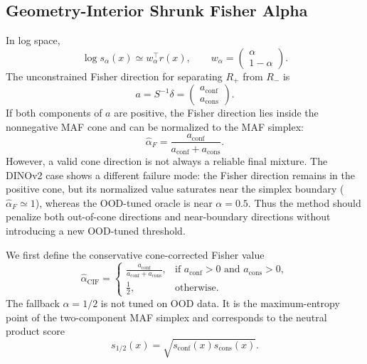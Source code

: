 \subsection{Geometry-Interior Shrunk Fisher Alpha}

In log space,
\begin{equation}
    \log s_{\alpha}(x)
    \simeq
    w_{\alpha}^{\top} r(x),
    \qquad
    w_{\alpha}
    =
    \begin{pmatrix}
        \alpha\\
        1-\alpha
    \end{pmatrix}.
\end{equation}
The unconstrained Fisher direction for separating $R_{+}$ from $R_{-}$ is
\begin{equation}
    a = S^{-1}\delta
    =
    \begin{pmatrix}
        a_{\mathrm{conf}}\\
        a_{\mathrm{cons}}
    \end{pmatrix}.
\end{equation}
If both components of $a$ are positive, the Fisher direction lies inside the
nonnegative MAF cone and can be normalized to the MAF simplex:
\begin{equation}
    \hat{\alpha}_{F}
    =
    \frac{a_{\mathrm{conf}}}
         {a_{\mathrm{conf}}+a_{\mathrm{cons}}}.
\end{equation}
However, a valid cone direction is not always a reliable final mixture.  The
DINOv2 case shows a different failure mode: the Fisher direction remains in the
positive cone, but its normalized value saturates near the simplex boundary
($\hat{\alpha}_{F}\simeq 1$), whereas the OOD-tuned oracle is near
$\alpha=0.5$.  Thus the method should penalize both out-of-cone directions and
near-boundary directions without introducing a new OOD-tuned threshold.

We first define the conservative cone-corrected Fisher value
\begin{equation}
    \hat{\alpha}_{\mathrm{CIF}}
    =
    \begin{cases}
    \displaystyle
    \frac{a_{\mathrm{conf}}}
         {a_{\mathrm{conf}}+a_{\mathrm{cons}}},
    & \text{if } a_{\mathrm{conf}}>0
      \text{ and } a_{\mathrm{cons}}>0,\\[2.2ex]
    \displaystyle
    \frac{1}{2},
    & \text{otherwise.}
    \end{cases}
    \label{eq:cif_alpha}
\end{equation}
The fallback $\alpha=1/2$ is not tuned on OOD data.  It is the maximum-entropy
point of the two-component MAF simplex and corresponds to the neutral product
score
\begin{equation}
    s_{1/2}(x)
    =
    \sqrt{s_{\mathrm{conf}}(x)s_{\mathrm{cons}}(x)}.
\end{equation}

